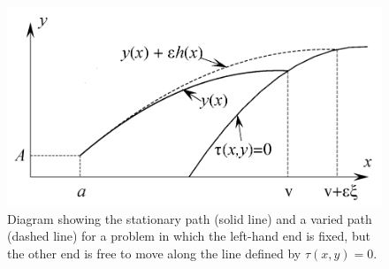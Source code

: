 \newcommand{\w}{v + \epsilon \xi + \mathcal{O}\lr{\epsilon^2}}
\newcommand{\z}{\epsilon \xi + \mathcal{O}\lr{\epsilon^2}}%
\renewcommand{\ve}{v_\epsilon}%
\graphicspath{ {./images/}}%
\begin{figure}[h]
\centering
\includegraphics[width=\textwidth]{figure10_6.png}
\caption{Diagram showing the stationary path (solid line) and a varied path (dashed line) for a problem in which the left-hand end is fixed, but the other end is free to move along the line defined by $\tau(x, y) = 0$.}
\label{fig:mesh1}
\end{figure}

